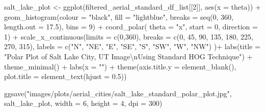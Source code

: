 \documentclass[
  letterpaper,
  DIV=11,
  numbers=noendperiod]{scrreprt}
\newenvironment{Shaded}{\begin{snugshade}}{\end{snugshade}}
\newcommand{\AttributeTok}[1]{\textcolor[rgb]{0.40,0.45,0.13}{#1}}
\newcommand{\DecValTok}[1]{\textcolor[rgb]{0.68,0.00,0.00}{#1}}
\newcommand{\FloatTok}[1]{\textcolor[rgb]{0.68,0.00,0.00}{#1}}
\newcommand{\FunctionTok}[1]{\textcolor[rgb]{0.28,0.35,0.67}{#1}}
\newcommand{\NormalTok}[1]{\textcolor[rgb]{0.00,0.23,0.31}{#1}}
\newcommand{\OtherTok}[1]{\textcolor[rgb]{0.00,0.23,0.31}{#1}}
\newcommand{\SpecialCharTok}[1]{\textcolor[rgb]{0.37,0.37,0.37}{#1}}
\newcommand{\StringTok}[1]{\textcolor[rgb]{0.13,0.47,0.30}{#1}}
\begin{document}
\begin{Shaded}
\begin{Highlighting}[]
\NormalTok{salt\_lake\_plot }\OtherTok{\textless{}{-}}
  \FunctionTok{ggplot}\NormalTok{(filtered\_aerial\_standard\_df\_list[[}\DecValTok{2}\NormalTok{]], }
         \FunctionTok{aes}\NormalTok{(}\AttributeTok{x =}\NormalTok{ theta)) }\SpecialCharTok{+}
  \FunctionTok{geom\_histogram}\NormalTok{(}\AttributeTok{colour =} \StringTok{"black"}\NormalTok{, }
                 \AttributeTok{fill =} \StringTok{"lightblue"}\NormalTok{, }
                 \AttributeTok{breaks =} \FunctionTok{seq}\NormalTok{(}\DecValTok{0}\NormalTok{, }\DecValTok{360}\NormalTok{, }\AttributeTok{length.out =} \FloatTok{17.5}\NormalTok{),}
                 \AttributeTok{bins =} \DecValTok{9}\NormalTok{) }\SpecialCharTok{+}
  \FunctionTok{coord\_polar}\NormalTok{(}
    \AttributeTok{theta =} \StringTok{"x"}\NormalTok{, }
    \AttributeTok{start =} \DecValTok{0}\NormalTok{, }
    \AttributeTok{direction =} \DecValTok{1}\NormalTok{) }\SpecialCharTok{+}
  \FunctionTok{scale\_x\_continuous}\NormalTok{(}\AttributeTok{limits =} \FunctionTok{c}\NormalTok{(}\DecValTok{0}\NormalTok{,}\DecValTok{360}\NormalTok{),}
    \AttributeTok{breaks =} \FunctionTok{c}\NormalTok{(}\DecValTok{0}\NormalTok{, }\DecValTok{45}\NormalTok{, }\DecValTok{90}\NormalTok{, }\DecValTok{135}\NormalTok{, }\DecValTok{180}\NormalTok{, }\DecValTok{225}\NormalTok{, }\DecValTok{270}\NormalTok{, }\DecValTok{315}\NormalTok{), }
    \AttributeTok{labels =} \FunctionTok{c}\NormalTok{(}\StringTok{"N"}\NormalTok{, }\StringTok{"NE"}\NormalTok{, }\StringTok{"E"}\NormalTok{, }\StringTok{"SE"}\NormalTok{, }\StringTok{"S"}\NormalTok{, }\StringTok{"SW"}\NormalTok{, }\StringTok{"W"}\NormalTok{, }\StringTok{"NW"}\NormalTok{)}
\NormalTok{  )}\SpecialCharTok{+}
  \FunctionTok{labs}\NormalTok{(}\AttributeTok{title =} \StringTok{"Polar Plot of Salt Lake City, UT Image}\SpecialCharTok{\textbackslash{}n}\StringTok{Using Standard HOG Technique"}\NormalTok{) }\SpecialCharTok{+}
  \FunctionTok{theme\_minimal}\NormalTok{() }\SpecialCharTok{+}
  \FunctionTok{labs}\NormalTok{(}\AttributeTok{x =} \StringTok{""}\NormalTok{) }\SpecialCharTok{+}
  \FunctionTok{theme}\NormalTok{(}\AttributeTok{axis.title.y =} \FunctionTok{element\_blank}\NormalTok{(),}
        \AttributeTok{plot.title =} \FunctionTok{element\_text}\NormalTok{(}\AttributeTok{hjust =} \FloatTok{0.5}\NormalTok{))}

\FunctionTok{ggsave}\NormalTok{(}\StringTok{"images/plots/aerial\_cities/salt\_lake\_standard\_polar\_plot.jpg"}\NormalTok{, salt\_lake\_plot, }\AttributeTok{width =} \DecValTok{6}\NormalTok{, }\AttributeTok{height =} \DecValTok{4}\NormalTok{, }\AttributeTok{dpi =} \DecValTok{300}\NormalTok{)}
\end{Highlighting}
\end{Shaded}
\end{document}
